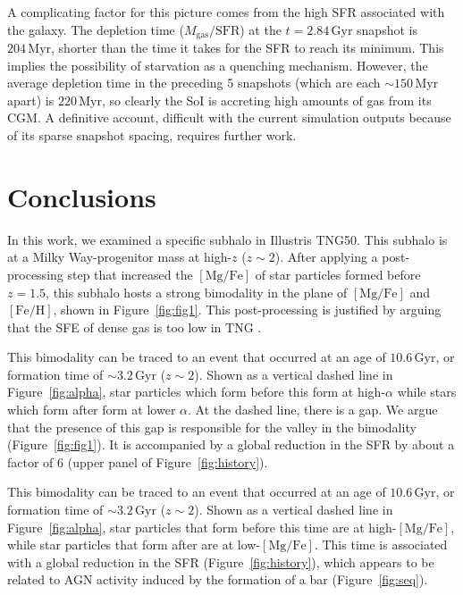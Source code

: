 \documentclass[twocolumn]{aastex631}
\newcommand{\Gyr}{\ensuremath{\textrm{Gyr}}}
\newcommand{\Myr}{\ensuremath{\textrm{Myr}}}
\newcommand{\FeH}{\ensuremath{[\textrm{Fe}/\textrm{H}]}}
\newcommand{\MgFe}{\ensuremath{[\textrm{Mg}/\textrm{Fe}]}}
\begin{document}
A complicating factor for this picture comes from the high SFR associated with the galaxy. The depletion time ($M_{\textrm{gas}}/\textrm{SFR}$) at the $t=2.84\,\Gyr$ snapshot is $204\,\Myr$, shorter than the time it takes for the SFR to reach its minimum. This implies the possibility of starvation as a quenching mechanism. However, the average depletion time in the preceding 5 snapshots (which are each $\sim150\,\Myr$ apart) is $220\,\Myr$, so clearly the SoI is accreting high amounts of gas from its CGM. A definitive account, difficult with the current simulation outputs because of its sparse snapshot spacing, requires further work.

\section{Conclusions}\label{sec:conc}
In this work, we examined a specific subhalo in Illustris TNG50. This subhalo is at a Milky Way-progenitor mass at high-$z$ ($z\sim2$). After applying a post-processing step that increased the \MgFe{} of star particles formed before $z=1.5$, this subhalo hosts a strong bimodality in the plane of \MgFe{} and \FeH{}, shown in Figure~\ref{fig:fig1}. This post-processing is justified by arguing that the SFE of dense gas is too low in TNG \citep[][see discussion in Section~\ref{ssec:sfe}]{2024arXiv240909121H}.

This bimodality can be traced to an event that occurred at an age of $10.6\,\Gyr$, or formation time of $\sim3.2\,\Gyr$ ($z\sim2$). Shown as a vertical dashed line in Figure~\ref{fig:alpha}, star particles which form before this form at high-$\alpha$ while stars which form after form at lower $\alpha$. At the dashed line, there is a gap. We argue that the presence of this gap is responsible for the valley in the bimodality (Figure~\ref{fig:fig1}). It is accompanied by a global reduction in the SFR by about a factor of 6 (upper panel of Figure~\ref{fig:history}).

This bimodality can be traced to an event that occurred at an age of $10.6\,\Gyr$, or formation time of $\sim3.2\,\Gyr$ ($z\sim2$). Shown as a vertical dashed line in Figure~\ref{fig:alpha}, star particles that form before this time are at high-\MgFe{}, while star particles that form after are at low-\MgFe{}. This time is associated with a global reduction in the SFR (Figure~\ref{fig:history}), which appears to be related to AGN activity induced by the formation of a bar (Figure~\ref{fig:seq}).
\end{document}
